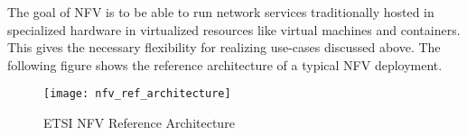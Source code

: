 \documentclass[../seminar.tex]{subfiles}
\begin{document}
The goal of NFV  is to be able to run network services traditionally hosted in specialized hardware in virtualized resources like virtual machines and containers. This gives the necessary flexibility for realizing use-cases discussed above.  The following figure shows the reference architecture of a typical NFV deployment. 

\begin{figure}
	\centering
	\texttt{[image: nfv\_ref\_architecture]}
	\label{fig:Figure 3}
	\caption{ETSI NFV Reference Architecture}
\end{figure}
\end{document}
